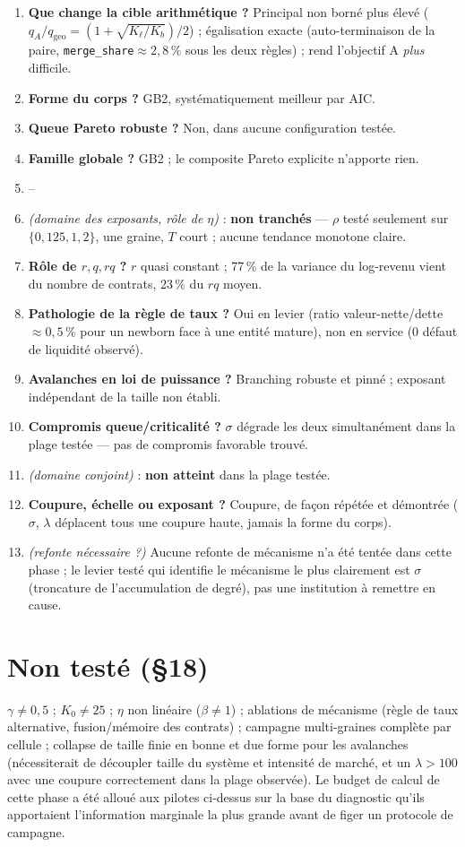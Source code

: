 \documentclass[11pt,a4paper]{article}
\newcommand{\code}[1]{\texttt{#1}}
\begin{document}
\begin{enumerate}[leftmargin=1.6em]
\item \textbf{Que change la cible arithmétique ?} Principal non borné plus
  élevé ($q_A/q_{\mathrm{geo}}=(1+\sqrt{K_\ell/K_b})/2$) ; égalisation
  exacte (auto-terminaison de la paire, \code{merge\_share}$\approx2{,}8\,\%$
  sous les deux règles) ; rend l'objectif A \emph{plus} difficile.
\item \textbf{Forme du corps ?} GB2, systématiquement meilleur par AIC.
\item \textbf{Queue Pareto robuste ?} Non, dans aucune configuration
  testée.
\item \textbf{Famille globale ?} GB2 ; le composite Pareto explicite
  n'apporte rien.
\item--\item[8] \emph{(domaine des exposants, rôle de $\eta$)} :
  \textbf{non tranchés} --- $\rho$ testé seulement sur $\{0{,}125,1,2\}$,
  une graine, $T$ court ; aucune tendance monotone claire.
\item \textbf{Rôle de $r,q,rq$ ?} $r$ quasi constant ; 77\,\% de la
  variance du log-revenu vient du nombre de contrats, 23\,\% du $rq$ moyen.
\item \textbf{Pathologie de la règle de taux ?} Oui en levier (ratio
  valeur-nette/dette $\approx0{,}5\,\%$ pour un newborn face à une
  entité mature), non en service (0 défaut de liquidité observé).
\item \textbf{Avalanches en loi de puissance ?} Branching robuste et
  pinné ; exposant indépendant de la taille non établi.
\item \textbf{Compromis queue/criticalité ?} $\sigma$ dégrade les deux
  simultanément dans la plage testée --- pas de compromis favorable trouvé.
\item[13] \emph{(domaine conjoint)} : \textbf{non atteint} dans la plage
  testée.
\item[15] \textbf{Coupure, échelle ou exposant ?} Coupure, de façon
  répétée et démontrée ($\sigma$, $\lambda$ déplacent tous une coupure
  haute, jamais la forme du corps).
\item[16] \emph{(refonte nécessaire ?)} Aucune refonte de mécanisme n'a
  été tentée dans cette phase ; le levier testé qui identifie le mécanisme
  le plus clairement est $\sigma$ (troncature de l'accumulation de degré),
  pas une institution à remettre en cause.
\end{enumerate}

\section{Non testé (§18)}

$\gamma\ne0{,}5$ ; $K_0\ne25$ ; $\eta$ non linéaire ($\beta\ne1$) ;
ablations de mécanisme (règle de taux alternative, fusion/mémoire des
contrats) ; campagne multi-graines complète par cellule ; collapse de
taille finie en bonne et due forme pour les avalanches (nécessiterait de
découpler taille du système et intensité de marché, et un $\lambda>100$
avec une coupure correctement dans la plage observée). Le budget de calcul
de cette phase a été alloué aux pilotes ci-dessus sur la base du
diagnostic qu'ils apportaient l'information marginale la plus grande avant
de figer un protocole de campagne.
\end{document}
